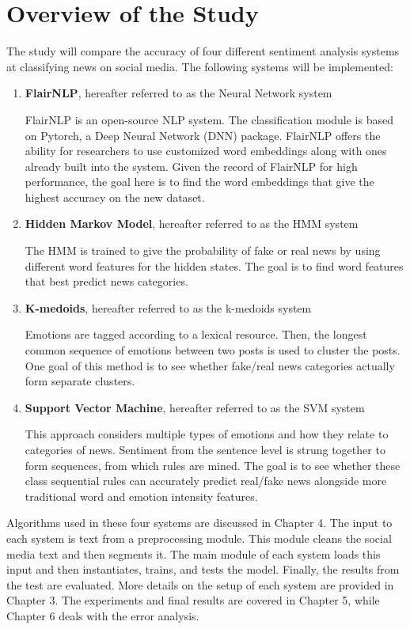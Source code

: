 \documentclass [11pt, proquest] {uwthesis}[2020/02/24]
\begin{document}
\section{Overview of the Study}
The study will compare the accuracy of four different sentiment analysis systems at classifying news on social media. The following systems will be implemented:
\begin{enumerate}
\item \textbf{FlairNLP}, hereafter referred to as the Neural Network system

FlairNLP is an open-source NLP system. The classification module is based on Pytorch, a Deep Neural Network (DNN) package. FlairNLP offers the ability for researchers to use customized word embeddings along with ones already built into the system.  Given the record of FlairNLP for high performance, the goal here is to find the word embeddings that give the highest accuracy on the new dataset.
\item \textbf{Hidden Markov Model}, hereafter referred to as the HMM system

The HMM is trained to give the probability of fake or real news by using different word features for the hidden states. The goal is to find word features that best predict news categories.

\item \textbf{K-medoids}, hereafter referred to as the k-medoids system

Emotions are tagged according to a lexical resource. Then, the longest common sequence of emotions between two posts is used to cluster the posts. One goal of this method is to see whether fake/real news categories actually form separate clusters.

\item \textbf{Support Vector Machine}, hereafter referred to as the SVM system

This approach considers multiple types of emotions and how they relate to categories of news. Sentiment from the sentence level is strung together to form sequences, from which rules are mined. The goal is to see whether these class sequential rules can accurately predict real/fake news alongside more traditional word and emotion intensity features.
\end{enumerate}

Algorithms used in these four systems are discussed in Chapter 4. The input to each system is text from a preprocessing module. This module cleans the social media text and then segments it. The main module of each system loads this input and then instantiates, trains, and tests the model. Finally, the results from the test are evaluated. More details on the setup of each system are provided in Chapter 3. The experiments and final results are covered in Chapter 5, while Chapter 6 deals with the error analysis.
 
\end{document}

